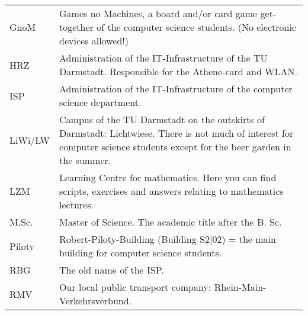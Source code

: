 \begin{longtable}{p{20mm}p{85mm}}
    GnoM         & Games no Machines, a board and/or card game get-together of the computer science students. (No electronic devices allowed!)                                                                                                                              \\
    HRZ          & Administration of the IT-Infrastructure of the TU Darmstadt. Responsible for the Athene-card and WLAN.                                                                                                                                                   \\
    ISP          & Administration of the IT-Infrastructure of the computer science department.                                                                                                                                                                              \\
    LiWi/LW      & Campus of the TU Darmstadt on the outskirts of Darmstadt: Lichtwiese. There is not much of interest for computer science students except for the beer garden in the summer.                                                                              \\
    LZM          & Learning Centre for mathematics. Here you can find scripts, exercises and answers relating to mathematics lectures.                                                                                                                                      \\
    M.Sc.        & Master of Science. The academic title after the B. Sc.                                                                                                                                                                                                   \\
    Piloty       & Robert-Piloty-Building (Building S2$|$02) = the main building for computer science students.                                                                                                                                                             \\
    RBG          & The old name of the ISP.                                                                                                                                                                                                                                 \\
    RMV          & Our local public transport company: Rhein-Main-Verkehrsverbund.                                                                                                                                                                                          \\

\end{longtable}
